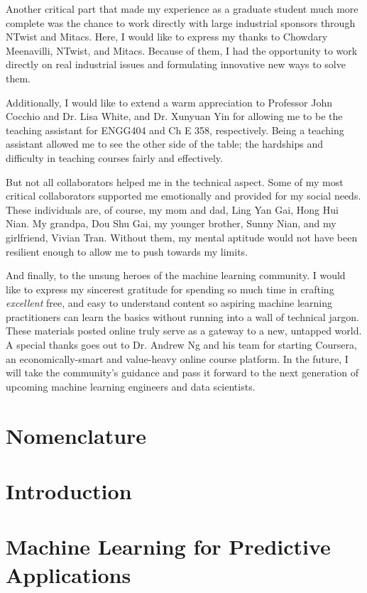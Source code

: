\documentclass[12pt]{report}
\begin{document}
Another critical part that made my experience as a graduate student much more complete was the chance to work directly with large industrial sponsors through NTwist and Mitacs.  Here, I would like to express my thanks to Chowdary Meenavilli, NTwist, and Mitacs.  Because of them, I had the opportunity to work directly on real industrial issues and formulating innovative new ways to solve them.

Additionally, I would like to extend a warm appreciation to Professor John Cocchio and Dr. Lisa White, and Dr. Xunyuan Yin for allowing me to be the teaching assistant for ENGG404 and Ch E 358, respectively.  Being a teaching assistant allowed me to see the other side of the table; the hardships and difficulty in teaching courses fairly and effectively.

But not all collaborators helped me in the technical aspect.  Some of my most critical collaborators supported me emotionally and provided for my social needs.  These individuals are, of course, my mom and dad, Ling Yan Gai, Hong Hui Nian.  My grandpa, Dou Shu Gai, my younger brother, Sunny Nian, and my girlfriend, Vivian Tran.  Without them, my mental aptitude would not have been resilient enough to allow me to push towards my limits.

And finally, to the unsung heroes of the machine learning community.  I would like to express my sincerest gratitude for spending so much time in crafting \textit{excellent} free, and easy to understand content so aspiring machine learning practitioners can learn the basics without running into a wall of technical jargon.  These materials posted online truly serve as a gateway to a new, untapped world. A special thanks goes out to Dr. Andrew Ng and his team for starting Coursera, an economically-smart and value-heavy online course platform. In the future, I will take the community's guidance and pass it forward to the next generation of upcoming machine learning engineers and data scientists.

\chapter*{Nomenclature}

\chapter{Introduction}


\chapter{Machine Learning for Predictive Applications}

\end{document}
